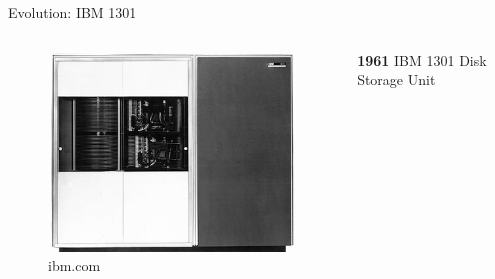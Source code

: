 \documentclass[12pt]{beamer}
\begin{document}
\begin{frame}[fragile]{Evolution: IBM 1301}
	\begin{columns}[c]
	\begin{column}[c]{.5\textwidth}	
 		\begin{figure}[c]
	 		\centering
	 		\includegraphics[width=\linewidth]{img/ibm_1301.jpg}
	 			\caption{ibm.com}
 		\end{figure}
 	\end{column}
 	
	\begin{column}[c]{.5\textwidth}
		\textbf{1961} IBM 1301 Disk Storage Unit
	\end{column}
	\end{columns}
\end{frame}
\end{document}
